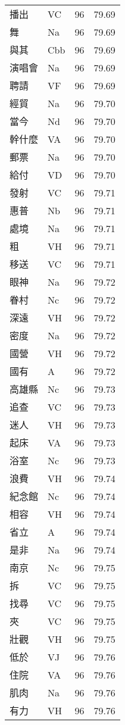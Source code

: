 \documentclass[twocolumn]{book}
\begin{document}
\begin{supertabular}{llrr}
播出 & VC & 96 &  79.69\\
舞 & Na & 96 &  79.69\\
與其 & Cbb & 96 &  79.69\\
演唱會 & Na & 96 &  79.69\\
聘請 & VF & 96 &  79.69\\
經貿 & Na & 96 &  79.70\\
當今 & Nd & 96 &  79.70\\
幹什麼 & VA & 96 &  79.70\\
郵票 & Na & 96 &  79.70\\
給付 & VD & 96 &  79.70\\
發射 & VC & 96 &  79.71\\
惠普 & Nb & 96 &  79.71\\
處境 & Na & 96 &  79.71\\
粗 & VH & 96 &  79.71\\
移送 & VC & 96 &  79.71\\
眼神 & Na & 96 &  79.72\\
眷村 & Nc & 96 &  79.72\\
深遠 & VH & 96 &  79.72\\
密度 & Na & 96 &  79.72\\
國營 & VH & 96 &  79.72\\
國有 & A & 96 &  79.72\\
高雄縣 & Nc & 96 &  79.73\\
追查 & VC & 96 &  79.73\\
迷人 & VH & 96 &  79.73\\
起床 & VA & 96 &  79.73\\
浴室 & Nc & 96 &  79.73\\
浪費 & VH & 96 &  79.74\\
紀念館 & Nc & 96 &  79.74\\
相容 & VH & 96 &  79.74\\
省立 & A & 96 &  79.74\\
是非 & Na & 96 &  79.74\\
南京 & Nc & 96 &  79.75\\
拆 & VC & 96 &  79.75\\
找尋 & VC & 96 &  79.75\\
夾 & VC & 96 &  79.75\\
壯觀 & VH & 96 &  79.75\\
低於 & VJ & 96 &  79.76\\
住院 & VA & 96 &  79.76\\
肌肉 & Na & 96 &  79.76\\
有力 & VH & 96 &  79.76\\

\end{supertabular}
\end{document}
